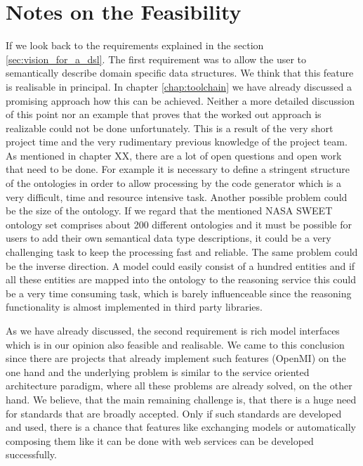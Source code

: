 \section{Notes on the Feasibility}
\par
If we look back to the requirements explained in the section \ref{sec:vision_for_a_dsl}. The first requirement was to allow the user to semantically describe domain specific data structures. We think that this feature is realisable in principal. In chapter \ref{chap:toolchain} we have already discussed a promising approach how this can be achieved. Neither a more detailed discussion of this point nor an example that proves that the worked out approach is realizable could not be done unfortunately. This is a result of the very short project time and the very rudimentary previous knowledge of the project team.  As mentioned in chapter XX, there are a lot of open questions and open work that need to be done. For example it is necessary to define a stringent structure of the ontologies in order to allow processing by the code generator which is a very difficult, time and resource intensive task. Another possible problem could be the size of the ontology. If we regard that the mentioned NASA SWEET ontology set comprises about 200 different ontologies and it must be possible for users to add their own semantical data type descriptions, it could be a very challenging task to keep the processing fast and reliable. The same problem could be the inverse direction. A model could easily consist of a hundred entities and if all these entities are mapped into the ontology to the reasoning service this could be a very time consuming task, which is barely influenceable since the reasoning functionality is almost implemented in third party libraries.
\par
As we have already discussed, the second requirement is rich model interfaces which is in our opinion also feasible and realisable. We came to this conclusion since there are projects that already implement such features (OpenMI) on the one hand and the underlying problem is similar to the service oriented architecture paradigm, where all these problems are already solved, on the other hand. We believe, that the main remaining challenge is, that there is a huge need for standards that are broadly accepted. Only if such standards are developed and used, there is a chance that features like exchanging models or automatically composing them like it can be done with web services can be developed successfully.\\
